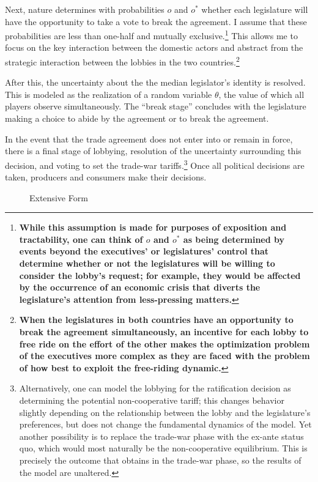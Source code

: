 \documentclass[10pt]{article}
\newcommand{\ta}{\theta}
\begin{document}
Next, nature determines with probabilities $o$ and $o^*$ whether each legislature will have the opportunity to take a vote to break the agreement. I assume that these probabilities are less than one-half and mutually exclusive.\footnote{\textbf{While this assumption is made for purposes of exposition and tractability, one can think of $o$ and $o^*$ as being determined by events beyond the executives' or legislatures' control that determine whether or not the legislatures will be willing to consider the lobby's request; for example, they would be affected by the occurrence of an economic crisis that diverts the legislature's attention from less-pressing matters.}} This allows me to focus on the key interaction between the domestic actors and abstract from the strategic interaction between the lobbies in the two countries.\footnote{\textbf{When the legislatures in both countries have an opportunity to break the agreement simultaneously, an incentive for each lobby to free ride on the effort of the other makes the optimization problem of the executives more complex as they are faced with the problem of how best to exploit the free-riding dynamic.}}

After this, the uncertainty about the the median legislator's identity is resolved. This is modeled as the realization of a random variable $\ta$, the value of which all players observe simultaneously. The ``break stage'' concludes with the legislature making a choice to abide by the agreement or to break the agreement.

In the event that the trade agreement does not enter into or remain in force, there is a final stage of lobbying, resolution of the uncertainty surrounding this decision, and voting to set the trade-war tariffs.\footnote{Alternatively, one can model the lobbying for the ratification decision as determining the potential non-cooperative tariff; this changes behavior slightly depending on the relationship between the lobby and the legislature's preferences, but does not change the fundamental dynamics of the model. Yet another possibility is to replace the trade-war phase with the ex-ante status quo, which would most naturally be the non-cooperative equilibrium. This is precisely the outcome that obtains in the trade-war phase, so the results of the model are unaltered.} Once all political decisions are taken, producers and consumers make their decisions.

\begin{figure}
	\begin{center}
		
	\end{center}
	\caption{Extensive Form\label{fig:ext}}
\end{figure}
\end{document}
